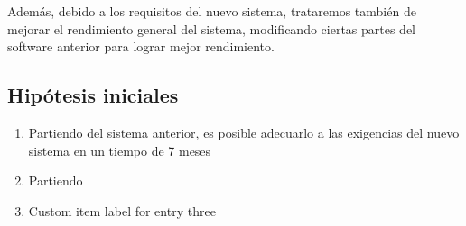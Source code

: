 Además, debido a los requisitos del nuevo sistema, trataremos también de mejorar el rendimiento general del sistema, modificando ciertas partes del software anterior para lograr mejor rendimiento.

\subsection{Hipótesis iniciales}

\makeatletter
\label{sec:mylabel}
\begin{enumerate}[label={H\arabic*}]
	\item[\namedlabel{H1}]  Partiendo del sistema anterior, es posible adecuarlo a las exigencias del nuevo sistema en un tiempo de 7 meses %
	\item[\namedlabel{H2}]  Partiendo  
	\item[\namedlabel{H3}]  Custom item label for entry three
\end{enumerate}
\makeatother



